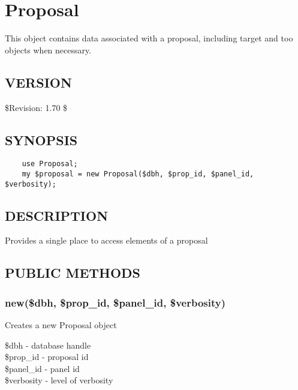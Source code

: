 \documentclass{article}
\begin{document}
\clearpage
\section{Proposal\label{Proposal}}


This object contains data associated with a proposal,
including target and too objects when necessary.

\subsection*{VERSION\label{Proposal_VERSION}}


\$Revision: 1.70 \$

\subsection*{SYNOPSIS\label{Proposal_SYNOPSIS}}
\begin{verbatim}
    use Proposal;
    my $proposal = new Proposal($dbh, $prop_id, $panel_id, $verbosity);
\end{verbatim}
\subsection*{DESCRIPTION\label{Proposal_DESCRIPTION}}


Provides a single place to access elements of a proposal

\subsection*{PUBLIC METHODS\label{Proposal_PUBLIC_METHODS}}
\subsubsection*{new(\$dbh, \$prop\_id, \$panel\_id, \$verbosity)\label{Proposal_new_dbh_prop_id_panel_id_verbosity_}}


Creates a new Proposal object

\begin{description}

\item[{\$dbh - database handle}] \mbox{}
\item[{\$prop\_id - proposal id}] \mbox{}
\item[{\$panel\_id - panel id}] \mbox{}
\item[{\$verbosity - level of verbosity}] \mbox{}\end{description}
\end{document}
